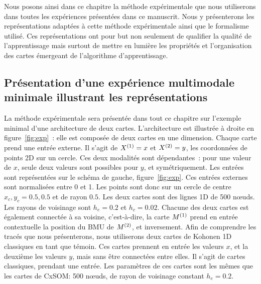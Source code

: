 \documentclass[../main]{subfiles}
\begin{document}
Nous posons ainsi dans ce chapitre la méthode expérimentale que nous utiliserons dans toutes les expériences présentées dans ce manuscrit. 
Nous y présenterons les représentations adaptées à cette méthode expérimentale ainsi que le formalisme utilisé.
Ces représentations ont pour but non seulement de qualifier la qualité de l'apprentissage mais surtout de mettre en lumière les propriétés et l'organisation des cartes émergeant de l'algorithme d'apprentissage. 

\subsection{Présentation d'une expérience multimodale minimale illustrant les représentations}

La méthode expérimentale sera présentée dans tout ce chapitre sur l'exemple minimal d'une architecture de deux cartes. L'architecture est illustrée à droite en figure~\ref{fig:exp}~: elle est composée de deux cartes en une dimension. Chaque carte prend une entrée externe. Il s'agit de $X^{({1})}=x$ et $X^{({2})}=y$, les coordonnées de points 2D sur un cercle. Ces deux modalités sont dépendantes~: pour une valeur de $x$, seule deux valeurs sont possibles pour $y$, et symétriquement. Les entrées sont représentées sur le schéma de gauche, figure~\ref{fig:exp}.
Ces entrées externes sont normalisées entre 0 et 1. Les points sont donc sur un cercle de centre $x_c,y_c = 0.5,0.5$ et de rayon $0.5$.
Les deux cartes sont des lignes 1D de 500 n\oe{}uds. Les rayons de voisinage sont $h_e = 0.2$ et $h_c = 0.02$.
Chacune des deux cartes est également connectée à sa voisine, c'est-à-dire, la carte $M^{({1})}$ prend en entrée contextuelle la position du BMU de $M^{({2})}$, et inversement.
Afin de comprendre les tracés que nous présenterons, nous utiliserons deux cartes de Kohonen 1D classiques en tant que témoin.
Ces cartes prennent en entrée les valeurs $x$, et la deuxième les valeurs $y$, mais sans être connectées entre elles. Il s'agit de cartes classiques, prendant une entrée. Les paramètres de ces cartes sont les mêmes que les cartes de CxSOM: 500 n\oe{}uds, de rayon de voisinage constant $h_e = 0.2$.
\end{document}
